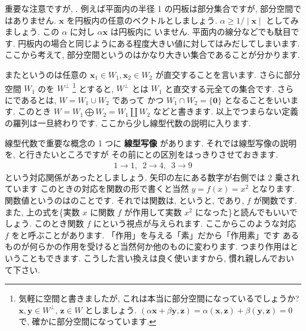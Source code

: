 \documentclass[openany, a4paper, oneside]{jsbook}
\begin{document}
重要な注意ですが, .
例えば平面内の半径 1 の円板は部分集合ですが, 部分空間ではありません.
 $\bm{x}$ を円板内の任意のベクトルとしましょう.
 $\alpha \geq 1/\mid \bm{x} \mid$ としてみましょう. この $\alpha$ に対し $\alpha \bm{x}$ は円板内に
いません. 平面内の線分などでも駄目です. 円板内の場合と同じようにある程度大きい値に対してはみだしてしまいます.
ここから考えて, 部分空間というのはかなり大きい集合であることが分かります.

またというのは任意の $\bm{x}_1 \in W_1,\bm{x}_2 \in W_2$ が直交することを言います.
さらに部分空間 $W_1$ のを $W^{\perp}$ \footnote{気軽に空間と書きましたが, これは本当に部分空間になっているでしょうか?
$\bm{x},\bm{y} \in W^{\perp},\, \bm{z} \in W$ としましょう.
$(\alpha \bm{x} + \beta\bm{y},\bm{z}) = \alpha (\bm{x},\bm{z}) + \beta (\bm{y},\bm{z}) =0$
で, 確かに部分空間になっています.}
とすると,  $W^{\perp}$ とは
 $W_1$ と直交する元全ての集合です.
さらにであるとは,  $W = W_1 \cup W_2$ であって
かつ $W_1 \cap W_2 = \{ \bm{0} \}$ となることをいいます.
このとき $W = W_1 \bigoplus W_2 = W_1 \amalg W_2$ などと書きます.
以上でつまらない定義の羅列は一旦終わりです.
ここから少し線型代数の説明に入ります.

線型代数で重要な概念の 1 つに \textbf{線型写像} があります.
それでは線型写像の説明を, と行きたいところですが
その前にとの区別をはっきりさせておきます.
\begin{align}
1 \longrightarrow 1 ,\,\,\, 2 \longrightarrow 4 ,\,\,\, 3 \longrightarrow 9
\end{align}
という対応関係があったとしましょう. 矢印の左にある数字が右側では 2 乗されています
このときの対応を関数の形で書くと当然 $y = f (x) = x^{2}$ となります.
関数値というのはのことです. それでは関数は, というと,
であり,  $f$ が関数です.
また, 上の式を\textgt\{実数 $x$ に関数 $f$ が作用して実数 $x^{2}$ になった\}と読んでもいいでしょう.
このとき関数 $f$ にという視点が与えられます.
ここからこのような対応 $f$ をと呼ぶことがあります.
「作用」を与える「素」だから「作用素」です
あるものが何らかの作用を受けると当然何か他のものに変わります.
つまり作用はということもできます.
こうした言い換えは良く使いますから, 慣れ親しんでおいて下さい.
\end{document}
